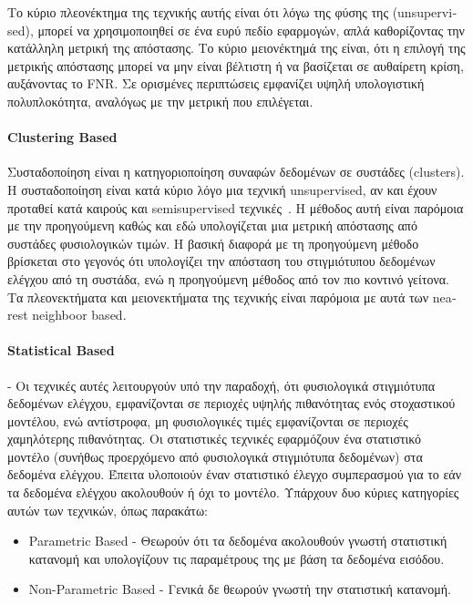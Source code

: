 \documentclass[12pt]{report}
\begin{document}
Το κύριο πλεονέκτημα της τεχνικής αυτής είναι ότι λόγω της φύσης της (\textlatin{unsupervised}), μπορεί να χρησιμοποιηθεί σε ένα ευρύ πεδίο εφαρμογών, απλά καθορίζοντας την κατάλληλη μετρική της απόστασης. Το κύριο μειονέκτημά της είναι, ότι η επιλογή της μετρικής απόστασης μπορεί να μην είναι βέλτιστη ή να βασίζεται σε αυθαίρετη κρίση, αυξάνοντας το \textlatin{FNR}. Σε ορισμένες περιπτώσεις εμφανίζει υψηλή υπολογιστική πολυπλοκότητα, αναλόγως με την μετρική που επιλέγεται.

\paragraph{\textlatin{Clustering Based}} Συσταδοποίηση είναι η κατηγοριοποίηση συναφών δεδομένων σε συστάδες (\textlatin{clusters}). Η συσταδοποίηση είναι κατά κύριο λόγο μια τεχνική \textlatin{unsupervised}, αν και έχουν προταθεί κατά καιρούς και \textlatin{semisupervised} τεχνικές~\cite{paper:14}. Η μέθοδος αυτή είναι παρόμοια με την προηγούμενη καθώς και εδώ υπολογίζεται μια μετρική απόστασης από συστάδες φυσιολογικών τιμών. Η βασική διαφορά με τη προηγούμενη μέθοδο βρίσκεται στο γεγονός ότι υπολογίζει την απόσταση του στιγμιότυπου δεδομένων ελέγχου από τη συστάδα, ενώ η προηγούμενη μέθοδος από τον πιο κοντινό γείτονα. Τα πλεονεκτήματα και μειονεκτήματα της τεχνικής είναι παρόμοια με αυτά των \textlatin{nearest neighboor based}.

\paragraph{\textlatin{Statistical Based}} - Οι τεχνικές αυτές λειτουργούν υπό την παραδοχή, ότι φυσιολογικά στιγμιότυπα δεδομένων ελέγχου, εμφανίζονται σε περιοχές υψηλής πιθανότητας ενός στοχαστικού μοντέλου, ενώ αντίστροφα, μη φυσιολογικές τιμές εμφανίζονται σε περιοχές χαμηλότερης πιθανότητας. Οι στατιστικές τεχνικές εφαρμόζουν ένα στατιστικό μοντέλο (συνήθως προερχόμενο από φυσιολογικά στιγμιότυπα δεδομένων) στα δεδομένα ελέγχου. Έπειτα υλοποιούν έναν στατιστικό έλεγχο συμπερασμού για το εάν τα δεδομένα ελέγχου ακολουθούν ή όχι το μοντέλο. Υπάρχουν δυο κύριες κατηγορίες αυτών των τεχνικών, όπως παρακάτω:
\begin{itemize}
	\item \textlatin{Parametric Based} - Θεωρούν ότι τα δεδομένα ακολουθούν γνωστή στατιστική κατανομή και υπολογίζουν τις παραμέτρους της με βάση τα δεδομένα εισόδου.
	\item \textlatin{Non-Parametric Based} - Γενικά δε θεωρούν γνωστή την στατιστική κατανομή.
\end{itemize}
\end{document}
